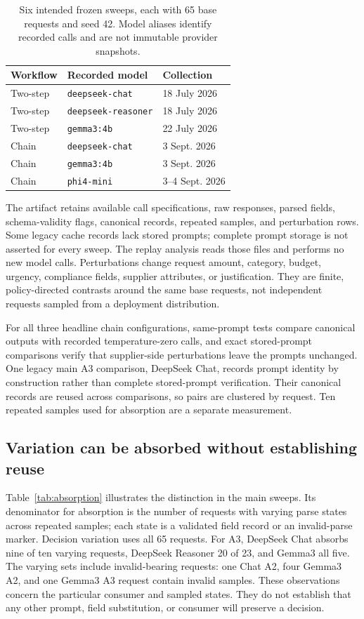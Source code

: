 \begin{table}[t]
\centering\small
\begin{tabular}{lll}
\toprule
Workflow & Recorded model & Collection \\
\midrule
Two-step & \texttt{deepseek-\allowbreak chat} & 18 July 2026 \\
Two-step & \texttt{deepseek-\allowbreak reasoner} & 18 July 2026 \\
Two-step & \texttt{gemma3:4b} & 22 July 2026 \\
Chain & \texttt{deepseek-\allowbreak chat} & 3 Sept. 2026 \\
Chain & \texttt{gemma3:4b} & 3 Sept. 2026 \\
Chain & \texttt{phi4-mini} & 3--4 Sept. 2026 \\
\bottomrule
\end{tabular}
\caption{Six intended frozen sweeps, each with 65 base requests and seed 42. Model aliases identify recorded calls and are not immutable provider snapshots.}
\label{tab:sweeps}
\end{table}

The artifact retains available call specifications, raw responses, parsed fields, schema-validity flags, canonical records, repeated samples, and perturbation rows. Some legacy cache records lack stored prompts; complete prompt storage is not asserted for every sweep. The replay analysis reads those files and performs no new model calls. Perturbations change request amount, category, budget, urgency, compliance fields, supplier attributes, or justification. They are finite, policy-directed contrasts around the same base requests, not independent requests sampled from a deployment distribution.

For all three headline chain configurations, same-prompt tests compare canonical outputs with recorded temperature-zero calls, and exact stored-prompt comparisons verify that supplier-side perturbations leave the prompts unchanged. One legacy main A3 comparison, DeepSeek Chat, records prompt identity by construction rather than complete stored-prompt verification. Their canonical records are reused across comparisons, so pairs are clustered by request. Ten repeated samples used for absorption are a separate measurement.

\subsection{Variation can be absorbed without establishing reuse}
Table~\ref{tab:absorption} illustrates the distinction in the main sweeps. Its denominator for absorption is the number of requests with varying parse states across repeated samples; each state is a validated field record or an invalid-parse marker. Decision variation uses all 65 requests. For A3, DeepSeek Chat absorbs nine of ten varying requests, DeepSeek Reasoner 20 of 23, and Gemma3 all five. The varying sets include invalid-bearing requests: one Chat A2, four Gemma3 A2, and one Gemma3 A3 request contain invalid samples. These observations concern the particular consumer and sampled states. They do not establish that any other prompt, field substitution, or consumer will preserve a decision.

